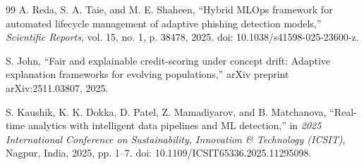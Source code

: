 \begin{thebibliography}{99}
A. Reda, S. A. Taie, and M. E. Shaheen, ``Hybrid MLOps framework for automated lifecycle management of adaptive phishing detection models,'' \textit{Scientific Reports}, vol. 15, no. 1, p. 38478, 2025. doi: 10.1038/s41598-025-23600-z.

S. John, ``Fair and explainable credit-scoring under concept drift: Adaptive explanation frameworks for evolving populations,'' arXiv preprint arXiv:2511.03807, 2025.

S. Kaushik, K. K. Dokka, D. Patel, Z. Mamadiyarov, and B. Matchanova, ``Real-time analytics with intelligent data pipelines and ML detection,'' in \textit{2025 International Conference on Sustainability, Innovation \& Technology (ICSIT)}, Nagpur, India, 2025, pp. 1--7. doi: 10.1109/ICSIT65336.2025.11295098.
\end{thebibliography}
